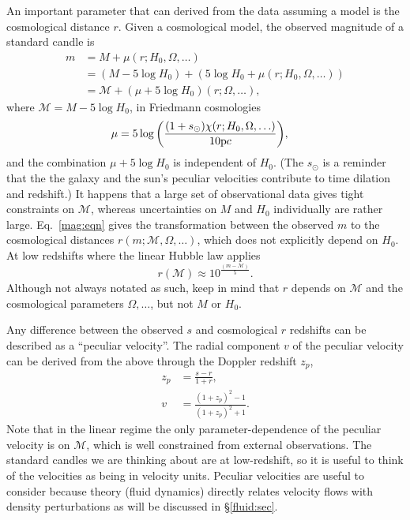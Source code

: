 \documentclass[11pt, oneside]{article}   	%
\begin{document}
An important parameter that can derived from the data assuming a model is the cosmological distance $r$.
Given a cosmological model, the observed magnitude of a standard candle is
\begin{align}
m & =M + \mu(r; H_0, \Omega,\ldots) \\
& = (M -5\log{H_0}) + (5\log{H_0}+ \mu(r; H_0, \Omega,\ldots))\\
& = \mathcal{M} +  (\mu+5\log{H_0})(r;  \Omega,\ldots),
\label{mag:eqn}
\end{align}
where $\mathcal{M} = M -5\log{H_0}$, in Friedmann cosmologies
\begin{align}
\mu & = 5\log{
	\left(
		\frac{(1+s_{\odot})\chi(r; H_0, \Omega,\ldots)}{10 \text pc}
	\right)
},
\end{align}
and the combination $\mu+5\log{H_0}$ is independent of $H_0$.  (The $s_{\odot}$ is a reminder that the the galaxy and the sun's peculiar
velocities contribute to time dilation and redshift.)
It happens that a large set of observational 
data gives tight constraints on $\mathcal{M}$, whereas uncertainties on $M$ and $H_0$ individually are
rather large.   Eq.~\ref{mag:eqn} gives the transformation
between the observed $m$ to the cosmological distances $r(m; \mathcal{M}, \Omega,\ldots)$, which does not explicitly depend on $H_0$.
At low redshifts where the linear Hubble law applies
\begin{equation}
r(\mathcal{M}) \approx 10^
{
\frac{(m-\mathcal{M})}{5}
}.
\end{equation}
Although not always notated as such, keep in mind that $r$ depends on $\mathcal{M}$ and the cosmological
parameters $\Omega, \ldots$, but not $M$ or $H_0$.

Any difference between the observed $s$ and cosmological $r$ redshifts can be described as
a
``peculiar velocity''.
The radial component $v$ of the peculiar velocity  can be derived from the above through
the Doppler redshift $z_p$,
\begin{align}
z_p & = \frac{s-r}{1+r},\\
v & = \frac{(1+z_p)^2-1}{(1+z_p)^2+1}.
\end{align}
Note that in the linear regime the only parameter-dependence of the peculiar velocity is on $\mathcal{M}$, which is well
constrained from external observations.
The standard candles we are thinking about are at low-redshift, so it is useful to think of the velocities as being
in velocity units.
Peculiar velocities are useful to consider because theory (fluid dynamics) directly relates velocity flows with density perturbations
as will be discussed in \S\ref{fluid:sec}.
\end{document}
